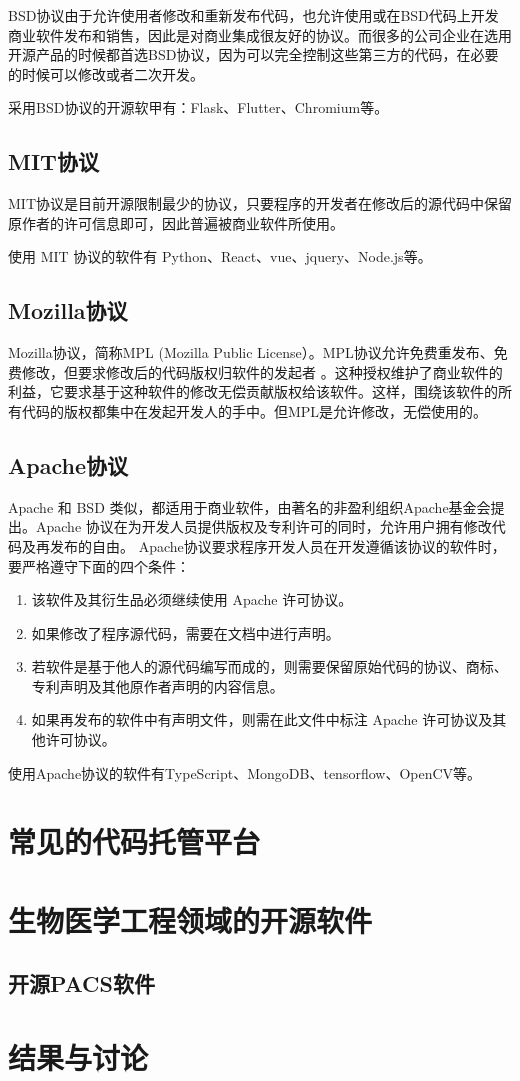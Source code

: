 \documentclass[UTF8]{ctexart}
\begin{document}
BSD协议由于允许使用者修改和重新发布代码，也允许使用或在BSD代码上开发商业软件发布和销售，因此是对商业集成很友好的协议。而很多的公司企业在选用开源产品的时候都首选BSD协议，因为可以完全控制这些第三方的代码，在必要的时候可以修改或者二次开发。

采用BSD协议的开源软甲有：Flask、Flutter、Chromium等。

\subsection{MIT协议}
MIT协议是目前开源限制最少的协议，只要程序的开发者在修改后的源代码中保留原作者的许可信息即可，因此普遍被商业软件所使用。

使用 MIT 协议的软件有 Python、React、vue、jquery、Node.js等。

\subsection{Mozilla协议}
Mozilla协议，简称MPL (Mozilla Public License）。MPL协议允许免费重发布、免费修改，但要求修改后的代码版权归软件的发起者 。这种授权维护了商业软件的利益，它要求基于这种软件的修改无偿贡献版权给该软件。这样，围绕该软件的所有代码的版权都集中在发起开发人的手中。但MPL是允许修改，无偿使用的。

\subsection{Apache协议}
Apache 和 BSD 类似，都适用于商业软件，由著名的非盈利组织Apache基金会提出。Apache 协议在为开发人员提供版权及专利许可的同时，允许用户拥有修改代码及再发布的自由。
Apache协议要求程序开发人员在开发遵循该协议的软件时，要严格遵守下面的四个条件：
\begin{enumerate}
    \item 该软件及其衍生品必须继续使用 Apache 许可协议。
    \item 如果修改了程序源代码，需要在文档中进行声明。
    \item 若软件是基于他人的源代码编写而成的，则需要保留原始代码的协议、商标、专利声明及其他原作者声明的内容信息。
    \item 如果再发布的软件中有声明文件，则需在此文件中标注 Apache 许可协议及其他许可协议。
\end{enumerate}

使用Apache协议的软件有TypeScript、MongoDB、tensorflow、OpenCV等。
\section{常见的代码托管平台}
\section{生物医学工程领域的开源软件}
\subsection{开源PACS软件}

\section{结果与讨论}



\end{document}
